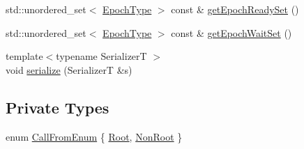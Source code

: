\begin{DoxyCompactItemize}
\item 
std\+::unordered\+\_\+set$<$ \hyperlink{namespacevt_a985a5adf291c34a3ca263b3378388236}{Epoch\+Type} $>$ const  \& \hyperlink{structvt_1_1term_1_1_termination_detector_a8eb6730fc343957d0a788919b641762e}{get\+Epoch\+Ready\+Set} ()
\item 
std\+::unordered\+\_\+set$<$ \hyperlink{namespacevt_a985a5adf291c34a3ca263b3378388236}{Epoch\+Type} $>$ const  \& \hyperlink{structvt_1_1term_1_1_termination_detector_aed77c0e79a681705e941314e7415df35}{get\+Epoch\+Wait\+Set} ()
\item 
{\footnotesize template$<$typename SerializerT $>$ }\\void \hyperlink{structvt_1_1term_1_1_termination_detector_a8736b208710ec6f7cfa1dd09a9205cab}{serialize} (SerializerT \&s)
\end{DoxyCompactItemize}
\subsection*{Private Types}
\begin{DoxyCompactItemize}
\item 
enum \hyperlink{structvt_1_1term_1_1_termination_detector_a4f3ede9a87f39d86e85f92b36a6c6a30}{Call\+From\+Enum} \{ \hyperlink{structvt_1_1term_1_1_termination_detector_a4f3ede9a87f39d86e85f92b36a6c6a30a4beac8e3ddc4064785a61aa7949e3bda}{Root}, 
\hyperlink{structvt_1_1term_1_1_termination_detector_a4f3ede9a87f39d86e85f92b36a6c6a30a73c8bf8079c6c90553937f74f98c99fc}{Non\+Root}
 \}
\end{DoxyCompactItemize}

